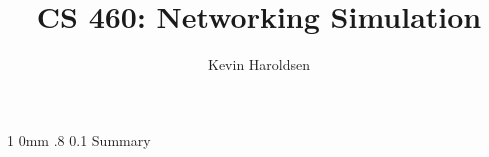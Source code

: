 \documentclass[fleqn,11pt]{article}
\title{CS 460: Networking Simulation}
\author{Kevin Haroldsen}
\date{}
\makeatletter
\renewcommand{\section}{\@startsection
   	{section}%
   	{1}%
   	{0mm}%
   	{.8\baselineskip}%
   	{0.1\baselineskip}%
   	{\bfseries}} %
\makeatother
\begin{document}
\maketitle

\section{Summary}
\end{document}
